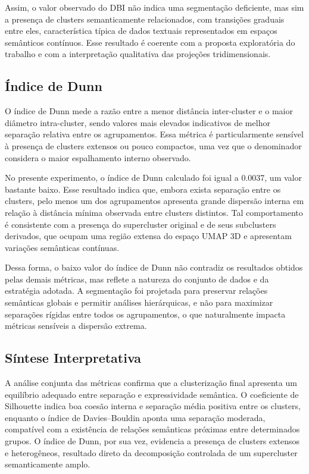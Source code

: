 \documentclass[12pt,a4paper]{article}
\begin{document}
Assim, o valor observado do DBI não indica uma segmentação deficiente, mas sim a presença de clusters semanticamente relacionados, com transições graduais entre eles, característica típica de dados textuais representados em espaços semânticos contínuos. Esse resultado é coerente com a proposta exploratória do trabalho e com a interpretação qualitativa das projeções tridimensionais.

\subsection{Índice de Dunn}

O índice de Dunn mede a razão entre a menor distância inter-cluster e o maior diâmetro intra-cluster, sendo valores mais elevados indicativos de melhor separação relativa entre os agrupamentos. Essa métrica é particularmente sensível à presença de clusters extensos ou pouco compactos, uma vez que o denominador considera o maior espalhamento interno observado.

No presente experimento, o índice de Dunn calculado foi igual a 0.0037, um valor bastante baixo. Esse resultado indica que, embora exista separação entre os clusters, pelo menos um dos agrupamentos apresenta grande dispersão interna em relação à distância mínima observada entre clusters distintos. Tal comportamento é consistente com a presença do supercluster original e de seus subclusters derivados, que ocupam uma região extensa do espaço UMAP 3D e apresentam variações semânticas contínuas.

Dessa forma, o baixo valor do índice de Dunn não contradiz os resultados obtidos pelas demais métricas, mas reflete a natureza do conjunto de dados e da estratégia adotada. A segmentação foi projetada para preservar relações semânticas globais e permitir análises hierárquicas, e não para maximizar separações rígidas entre todos os agrupamentos, o que naturalmente impacta métricas sensíveis a dispersão extrema.

\subsection{Síntese Interpretativa}

A análise conjunta das métricas confirma que a clusterização final apresenta um equilíbrio adequado entre separação e expressividade semântica. O coeficiente de Silhouette indica boa coesão interna e separação média positiva entre os clusters, enquanto o índice de Davies–Bouldin aponta uma separação moderada, compatível com a existência de relações semânticas próximas entre determinados grupos. O índice de Dunn, por sua vez, evidencia a presença de clusters extensos e heterogêneos, resultado direto da decomposição controlada de um supercluster semanticamente amplo.
\end{document}
